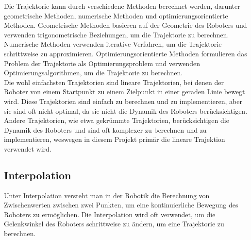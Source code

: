 \noindent
Die Trajektorie kann durch verschiedene Methoden berechnet werden, darunter geometrische Methoden, numerische Methoden und optimierungsorientierte Methoden. Geometrische Methoden basieren auf der Geometrie des Roboters und verwenden trigonometrische Beziehungen, um die Trajektorie zu berechnen. Numerische Methoden verwenden iterative Verfahren, um die Trajektorie schrittweise zu approximieren. Optimierungsorientierte Methoden formulieren das Problem der Trajektorie als Optimierungsproblem und verwenden Optimierungsalgorithmen, um die Trajektorie zu berechnen.
\\

\noindent
Die wohl einfachsten Trajektorien sind lineare Trajektorien, bei denen der Roboter von einem Startpunkt zu einem Zielpunkt in einer geraden Linie bewegt wird. Diese Trajektorien sind einfach zu berechnen und zu implementieren, aber sie sind oft nicht optimal, da sie nicht die Dynamik des Roboters berücksichtigen. Andere Trajektorien, wie etwa gekrümmte Trajektorien, berücksichtigen die Dynamik des Roboters und sind oft komplexer zu berechnen und zu implementieren, weswegen in diesem Projekt primär die lineare Trajektion verwendet wird.\\

\subsection{Interpolation}\label{subsec:Interpolation}
Unter Interpolation versteht man in der Robotik die Berechnung von Zwischenwerten zwischen zwei Punkten, um eine kontinuierliche Bewegung des Roboters zu ermöglichen. Die Interpolation wird oft verwendet, um die Gelenkwinkel des Roboters schrittweise zu ändern, um eine Trajektorie zu berechnen.
\\

